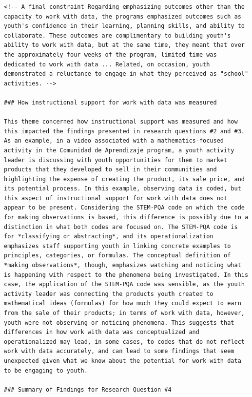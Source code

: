 \documentclass[]{book}
\theoremstyle{definition}
\theoremstyle{definition}
\theoremstyle{definition}
\theoremstyle{remark}
\begin{document}
\begin{verbatim}
<!-- A final constraint Regarding emphasizing outcomes other than the capacity to work with data, the programs emphasized outcomes such as youth's confidence in their learning, planning skills, and ability to collaborate. These outcomes are complimentary to building youth's ability to work with data, but at the same time, they meant that over the approximately four weeks of the program, limited time was dedicated to work with data ... Related, on occasion, youth demonstrated a reluctance to engage in what they perceived as "school" activities. -->

### How instructional support for work with data was measured

This theme concerned how instructional support was measured and how this impacted the findings presented in research questions #2 and #3. As an example, in a video associated with a mathematics-focused activity in the Comunidad de Aprendizaje program, a youth activity leader is discussing with youth opportunities for them to market products that they developed to sell in their communities and highlighting the expense of creating the product, its sale price, and its potential process. In this example, observing data is coded, but this aspect of instructional support for work with data does not appear to be present. Considering the STEM-PQA code on which the code for making observations is based, this difference is possibly due to a distinction in what both codes are focused on. The STEM-PQA code is for *classifying or abstracting*, and its operationalization emphasizes staff supporting youth in linking concrete examples to principles, categories, or formulas. The conceptual definition of *making observations*, though, emphasizes watching and noticing what is happening with respect to the phenomena being investigated. In this case, the application of the STEM-PQA code was sensible, as the youth activity leader was connecting the products youth created to mathematical ideas (formulas) for how much they could expect to earn from the sale of their products; in terms of work with data, however, youth were not observing or noticing phenomena. This suggests that differences in how work with data was conceptualized and operationalized may lead, in some cases, to codes that do not reflect work with data accurately, and can lead to some findings that seem unexpected given what we know about the potential for work with data to be engaging to youth.

### Summary of Findings for Research Question #4


\end{verbatim}
\end{document}
